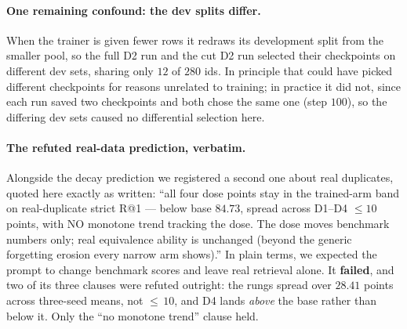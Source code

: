\paragraph{One remaining confound: the dev splits differ.}When the trainer is given fewer rows it redraws its development split from the smaller pool, so the full D2 run and the cut D2 run selected their checkpoints on different dev sets, sharing only $12$ of $280$ ids. In principle that could have picked different checkpoints for reasons unrelated to training; in practice it did not, since each run saved two checkpoints and both chose the same one (step $100$), so the differing dev sets caused no differential selection here.

\paragraph{The refuted real-data prediction, verbatim.}Alongside the decay prediction we registered a second one about real duplicates, quoted here exactly as written: ``all four dose points stay in the trained-arm band on real-duplicate strict R@1 --- below base $84.73$, spread across D1--D4 $\le 10$ points, with NO monotone trend tracking the dose. The dose moves benchmark numbers only; real equivalence ability is unchanged (beyond the generic forgetting erosion every narrow arm shows).'' In plain terms, we expected the prompt to change benchmark scores and leave real retrieval alone. It \textbf{failed}, and two of its three clauses were refuted outright: the rungs spread over $28.41$ points across three-seed means, not ${\le}\,10$, and D4 lands \emph{above} the base rather than below it. Only the ``no monotone trend'' clause held.

